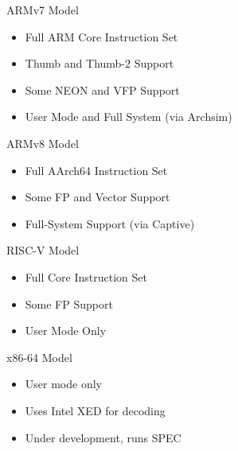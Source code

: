 \begin{frame}{ARMv7 Model}

\begin{itemize}
	\item Full ARM Core Instruction Set
	\item Thumb and Thumb-2 Support
	\item Some NEON and VFP Support
	\item User Mode and Full System (via Archsim)
\end{itemize}

\end{frame}

\begin{frame}{ARMv8 Model}

\begin{itemize}
	\item Full AArch64 Instruction Set
	\item Some FP and Vector Support
	\item Full-System Support (via Captive)
\end{itemize}

\end{frame}

\begin{frame}{RISC-V Model}

\begin{itemize}
	\item Full Core Instruction Set
	\item Some FP Support
	\item User Mode Only
\end{itemize}

\end{frame}

\begin{frame}{x86-64 Model}
\begin{itemize}
	\item User mode only
	\item Uses Intel XED for decoding
	\item Under development, runs SPEC
\end{itemize}
\end{frame}
